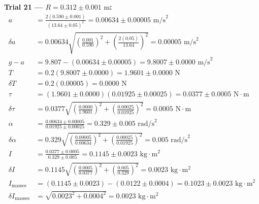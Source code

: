 \documentclass[11pt]{article}
\begin{document}
\textbf{Trial 21 — $R = 0.312 \pm 0.001\text{ m}$:}
\begin{align*}
a &= \frac{2(0.590 \pm 0.001)}{(13.64 \pm 0.05)^2} = 0.00634 \pm 0.00005\text{ m/s}^2 \\
\delta a &= 0.00634\sqrt{\left(\frac{0.001}{0.590}\right)^2 + \left(\frac{2(0.05)}{13.64}\right)^2} = 0.00005\text{ m/s}^2 \\
g - a &= 9.807 - (0.00634 \pm 0.00005) = 9.8007 \pm 0.0000\text{ m/s}^2 \\
T &= 0.2(9.8007 \pm 0.0000) = 1.9601 \pm 0.0000\text{ N} \\
\delta T &= 0.2(0.00005) = 0.0000\text{ N} \\
\tau &= (1.9601 \pm 0.0000)(0.01925 \pm 0.00025) = 0.0377 \pm 0.0005\text{ N}\cdot\text{m} \\
\delta\tau &= 0.0377\sqrt{\left(\frac{0.0000}{1.9601}\right)^2 + \left(\frac{0.00025}{0.01925}\right)^2} = 0.0005\text{ N}\cdot\text{m} \\
\alpha &= \frac{0.00634 \pm 0.00005}{0.01925 \pm 0.00025} = 0.329 \pm 0.005\text{ rad/s}^2 \\
\delta\alpha &= 0.329\sqrt{\left(\frac{0.00005}{0.00634}\right)^2 + \left(\frac{0.00025}{0.01925}\right)^2} = 0.005\text{ rad/s}^2 \\
I &= \frac{0.0377 \pm 0.0005}{0.329 \pm 0.005} = 0.1145 \pm 0.0023\text{ kg}\cdot\text{m}^2 \\
\delta I &= 0.1145\sqrt{\left(\frac{0.0005}{0.0377}\right)^2 + \left(\frac{0.005}{0.329}\right)^2} = 0.0023\text{ kg}\cdot\text{m}^2 \\
I_{\text{masses}} &= (0.1145 \pm 0.0023) - (0.0122 \pm 0.0004) = 0.1023 \pm 0.0023\text{ kg}\cdot\text{m}^2 \\
\delta I_{\text{masses}} &= \sqrt{0.0023^2 + 0.0004^2} = 0.0023\text{ kg}\cdot\text{m}^2
\end{align*}
\end{document}
